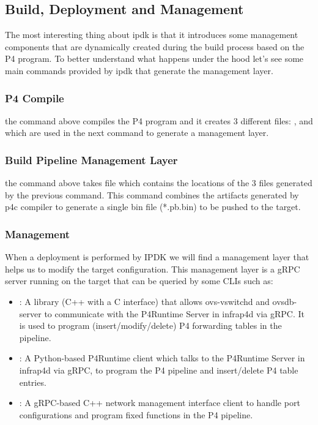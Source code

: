 \documentclass[../sn.tex]{subfiles}
\begin{document}
\subsection{Build, Deployment and Management}
The most interesting thing about \acrshort{ipdk} is that it introduces some management components that are dynamically created during the build process based on the P4 program. To better understand what happens under the hood let's see some main commands provided by \acrshort{ipdk} that generate the management layer.

\subsubsection*{P4 Compile}
the command above compiles the P4 program and it creates 3 different files: ,  and  which are used in the next command to generate a management layer.

\subsubsection*{Build Pipeline Management Layer}
the command above takes  file which contains the locations of the 3 files generated by the previous command. This command combines the artifacts generated by p4c compiler to generate a single bin file (*.pb.bin) to be pushed to the target.

\subsubsection*{Management}
When a deployment is performed by IPDK we will find a management layer that helps us to modify the target configuration. This management layer is a gRPC server running on the target that can be queried by some CLIs such as:
\begin{itemize}
    \item {}: A library (C++ with a C interface) that allows ovs-vswitchd and ovsdb-server to communicate with the P4Runtime Server in infrap4d via gRPC. It is used to program (insert/modify/delete) P4 forwarding tables in the pipeline.
    \item {}: A Python-based P4Runtime client which talks to the P4Runtime Server in infrap4d via gRPC, to program the P4 pipeline and insert/delete P4 table entries.
    \item {}: A gRPC-based C++ network management interface client to handle port configurations and program fixed functions in the P4 pipeline.
\end{itemize}
\end{document}
